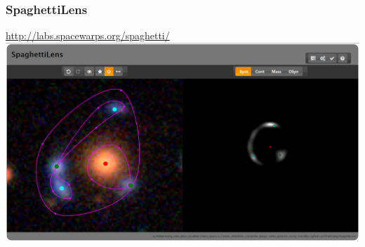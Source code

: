 \documentclass{beamer}
\begin{document}

\begin{frame}
	\frametitle{SpaghettiLens}
	\footnotesize{\url{http://labs.spacewarps.org/spaghetti/}}
  \includegraphics[width=\textwidth]{imgs/screenshot_new}

\end{frame}





%
%
\end{document}
